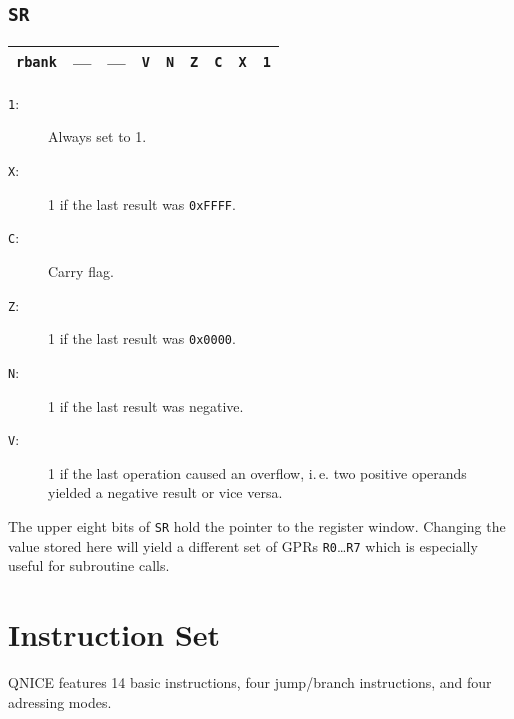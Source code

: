 \documentclass{leaflet}
\begin{document}
  \subsection{\texttt{SR}}
   \begin{center}
    \begin{longtable}{|c||c|c|c|c|c|c|c|c|}
     \hline
     {\tt rbank}&
     ---&---&{\tt V}&{\tt N}&{\tt Z}&{\tt C}&{\tt X}&{\tt 1}\\
     \hline
    \end{longtable}
   \end{center}
    \begin{description}
     \item [{\tt 1}:] Always set to 1.
     \item [{\tt X}:] 1 if the last result was {\tt 0xFFFF}.
     \item [{\tt C}:] Carry flag.
     \item [{\tt Z}:] 1 if the last result was {\tt 0x0000}.
     \item [{\tt N}:] 1 if the last result was negative.
     \item [{\tt V}:] 1 if the last operation caused an overflow, i.\,e. two
      positive operands yielded a negative result or vice versa.
    \end{description}
    The upper eight bits of \texttt{SR} hold the pointer to the register
    window. Changing the value stored here will yield a different set of 
    GPRs \texttt{R0}\dots\texttt{R7} which is especially useful for subroutine
    calls.
%
 \section{Instruction Set}
  QNICE features 14 basic instructions, four jump/branch instructions, and 
  four adressing modes.
%
\end{document}
